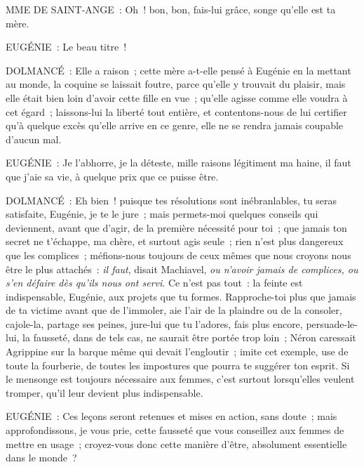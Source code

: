 \documentclass[french,twoside]{book} %
\begin{document}
MME DE SAINT-ANGE : Oh ! bon, bon, fais-lui grâce, songe qu’elle est ta mère.\par
EUGÉNIE : Le beau titre !\par
DOLMANCÉ : Elle a raison ; cette mère a-t-elle pensé à Eugénie en la mettant au monde, la coquine se laissait foutre, parce qu’elle y trouvait du plaisir, mais elle était bien loin d’avoir cette fille en vue ; qu’elle agisse comme elle voudra à cet égard ; laissons-lui la liberté tout entière, et contentons-nous de lui certifier qu’à quelque excès qu’elle arrive en ce genre, elle ne se rendra jamais coupable d’aucun mal.\par
EUGÉNIE : Je l’abhorre, je la déteste, mille raisons légitiment ma haine, il faut que j’aie sa vie, à quelque prix que ce puisse être.\par
DOLMANCÉ : Eh bien ! puisque tes résolutions sont inébranlables, tu seras satisfaite, Eugénie, je te le jure ; mais permets-moi quelques conseils qui deviennent, avant que d’agir, de la première nécessité pour toi ; que jamais ton secret ne t’échappe, ma chère, et surtout agis seule ; rien n’est plus dangereux que les complices ; méfions-nous toujours de ceux mêmes que nous croyons nous être le plus attachés : {\itshape il faut}, disait Machiavel, {\itshape ou n’avoir jamais de complices, ou s’en défaire dès qu’ils nous ont servi}. Ce n’est pas tout : la feinte est indispensable, Eugénie, aux projets que tu formes. Rapproche-toi plus que jamais de ta victime avant que de l’immoler, aie l’air de la plaindre ou de la consoler, cajole-la, partage ses peines, jure-lui que tu l’adores, fais plus encore, persuade-le-lui, la fausseté, dans de tels cas, ne saurait être portée trop loin ; Néron caressait Agrippine sur la barque même qui devait l’engloutir ; imite cet exemple, use de toute la fourberie, de toutes les impostures que pourra te suggérer ton esprit. Si le mensonge est toujours nécessaire aux femmes, c’est surtout lorsqu’elles veulent tromper, qu’il leur devient plus indispensable.\par
EUGÉNIE : Ces leçons seront retenues et mises en action, sans doute ; mais approfondissons, je vous prie, cette fausseté que vous conseillez aux femmes de mettre en usage ; croyez-vous donc cette manière d’être, absolument essentielle dans le monde ?\par
\end{document}
